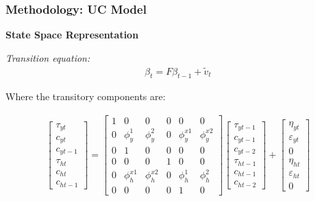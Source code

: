 \documentclass[10pt]{beamer}
\begin{document}
\begin{frame}[label=StateSpace]  
	\frametitle{Methodology: UC Model}
	
	\textbf{State Space Representation}
	
	\textit{Transition equation:}
	\begin{align}
		\beta_t = F\beta_{t-1} + \tilde{v}_t
	\end{align}
	
	Where the transitory components are:
	
	\begin{align}
		\begin{bmatrix}
			\tau_{yt}	\\
			c_{yt}		\\
			c_{yt-1}		\\
			\tau_{ht}	\\
			c_{ht}		\\
			c_{ht-1}		
		\end{bmatrix}
		=
		\begin{bmatrix}
			1	& 0	& 0	& 0	& 0	& 0	\\
			0	& \phi^1_y	& \phi^2_y	& 0	& \phi^{x1}_y	& \phi^{x2}_y	\\
			0	& 1	& 0	& 0 & 0 & 0  \\
			0	& 0	& 0	& 1	& 0	& 0 \\
			0	& \phi^{x1}_h	& \phi^{x2}_h	& 0 &\phi^1_h	& \phi^2_h	\\
			0	& 0	& 0	& 0 & 1 & 0
		\end{bmatrix}
		\begin{bmatrix}
			\tau_{yt-1}	\\
			c_{yt-1}		\\
			c_{yt-2}		\\
			\tau_{ht-1}	\\
			c_{ht-1}		\\
			c_{ht-2}		
		\end{bmatrix}
		+
		\begin{bmatrix}
			\eta_{yt}	\\
			\varepsilon_{yt}		\\
			0	\\
			\eta_{ht}	\\
			\varepsilon_{ht}		\\
			0	
		\end{bmatrix}
	\end{align}
	
\hyperlink{Reg_US}{} 	
	
\end{frame}
\end{document}

